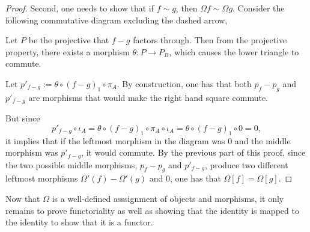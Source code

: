 \begin{proof}
    Second, one needs to show that if \( f \sim g \), then \( \Omega f \sim \Omega g \). Consider the following commutative diagram excluding the dashed arrow,
    \begin{center}
    \end{center}

    Let \( P \) be the projective that \( f - g \) factors through. Then from the projective property, there exists a morphism \( \theta: P \to P_B \), which causes the lower triangle to commute.

    Let \( p'_{f - g} := \theta \circ (f - g)_1 \circ \pi_A \). By construction, one has that both \( p_f - p_g \) and \( p'_{f - g} \) are morphisms that would make the right hand square commute.
    
    But since
    \[
        p'_{f - g} \circ \iota_A = \theta \circ (f-g)_1 \circ \pi_A \circ \iota_A = \theta \circ (f-g)_1 \circ 0 = 0,
    \]
    it implies that if the leftmost morphism in the diagram was \( 0 \) and the middle morphism was \( p'_{f - g} \), it would commute. By the previous part of this proof, since the two possible middle morphisms, \( p_f - p_g \) and \( p'_{f - g} \), produce two different leftmost morphisms \( \Omega'(f) - \Omega'(g) \) and \( 0 \), one has that \( \Omega [f] = \Omega [g] \).
\end{proof}

Now that \( \Omega \) is a well-defined asssignment of objects and morphisms, it only remains to prove functoriality as well as showing that the identity is mapped to the identity to show that it is a functor.

